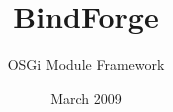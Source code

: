 \documentclass[
				a4paper,
				chapterprefix,
				appendixprefix,
				normalheadings,
				headsepline,
				12pt,
				DIV12,
				oneside,
				bibtotoc]
				{scrbook}
\begin{document}
\title{BindForge}


\author{OSGi Module Framework}

\date{March 2009}

\maketitle

\tableofcontents


\clearpage
{}



\clearpage
{}


\end{document}
